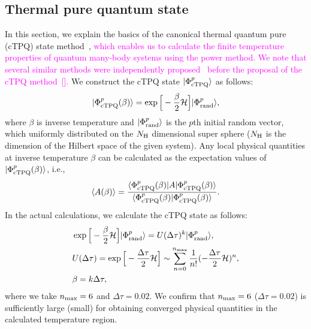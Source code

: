 \documentclass[reprint,amsmath,amssymb,aps,prx]{revtex4-2}
\newcommand{\magenta}[1]{\textcolor{magenta}{#1}}
\begin{document}
  \subsection{Thermal pure quantum state}
In this section, we explain the basics of the canonical thermal quantum pure (cTPQ) state method~\cite{Sugiura_PRL2013}, 
\magenta{which enables us to calculate the finite temperature properties of quantum many-body systems using the power method. 
We note that several similar methods were independently proposed~\cite{Imada_JPSJ1986,Jaklic_PRB1994,Hams_PRE2000,Lloyd} before the proposal of the cTPQ method~[\onlinecite{Sugiura_PRL2013}].}
We construct the 
cTPQ state $|\Phi_{\rm cTPQ}^{p}\rangle$ as follows:
\begin{align}
|\Phi_{\rm cTPQ}^{p}(\beta)\rangle = \exp\Big[-\frac{\beta}{2}\mathcal{H}\Big]|\Phi_{\rm rand}^{p}\rangle,
\end{align}
where $\beta$ is inverse temperature and 
$|\Phi_{\rm rand}^{p}\rangle$ is the $p$th initial random vector, which uniformly distributed
on the $N_{\rm H}$ dimensional super sphere ($N_{\rm H}$ is the dimension of the Hilbert space of the given system).
Any local physical quantities at inverse temperature $\beta$
can be calculated as the expectation values of $|\Phi_{\rm cTPQ}^{p}(\beta)\rangle$, i.e.,
\begin{align}
\langle A(\beta)\rangle
=\frac{\langle \Phi_{\rm cTPQ}^{p}(\beta)|A|\Phi_{\rm cTPQ}^{p}(\beta)\rangle}
{\langle \Phi_{\rm cTPQ}^{p}(\beta)|\Phi_{\rm cTPQ}^{p}(\beta)\rangle}.
\end{align}
In the actual calculations, we calculate the 
cTPQ state as follows:
\begin{align}
&\exp\Big[-\frac{\beta}{2}\mathcal{H}\Big]|\Phi_{\rm rand}^{p}\rangle=U(\Delta\tau)^{k}|\Phi_{\rm rand}^{p}\rangle,\\
&U(\Delta\tau)=\exp\Big[-\frac{\Delta\tau}{2}\mathcal{H}\Big]\sim\sum_{n=0}^{n_{\rm max}}\frac{1}{n!}(-\frac{\Delta\tau}{2}\mathcal{H})^{n},\\
&\beta=k\Delta\tau,
\end{align}
where we take $n_{\rm max}=6$ and $\Delta\tau =0.02$.
We confirm that $n_{\rm max}=6$ ($\Delta\tau=0.02$) is sufficiently
large (small) for obtaining converged physical quantities 
in the calculated temperature region.
\end{document}
